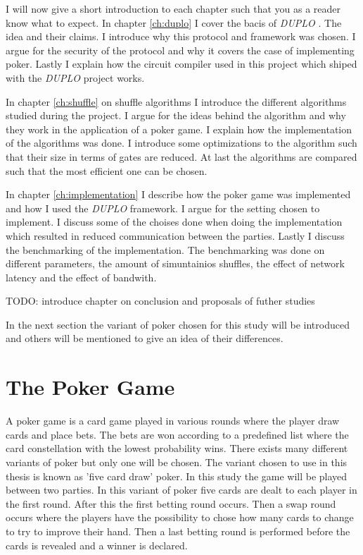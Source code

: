 \documentclass[twoside,11pt,openright]{report}
\newcommand{\todo}[1]{}
\renewcommand{\todo}[1]{{\color{red} TODO: {#1}} \\}
\newcommand{\DUPLO}{\textit{DUPLO} }
\begin{document}
\bigskip

I will now give a short introduction to each chapter such that you as a reader know what to expect. 
In chapter \ref{ch:duplo} I cover the bacis of \DUPLO. The idea and their claims. I introduce why this protocol and framework was chosen. I argue for the security of the protocol and why it covers the case of implementing poker. Lastly I explain how the circuit compiler used in this project which shiped with the \DUPLO project works.

In chapter \ref{ch:shuffle} on shuffle algorithms I introduce the different algorithms studied during the project. I argue for the ideas behind the algorithm and why they work in the application of a poker game. I explain how the implementation of the algorithms was done. I introduce some optimizations to the algorithm such that their size in terms of gates are reduced. At last the algorithms are compared such that the most efficient one can be chosen.

In chapter \ref{ch:implementation} I describe how the poker game was implemented and how I used the \DUPLO framework. I argue for the setting chosen to implement. I discuss some of the choises done when doing the implementation which resulted in reduced communication between the parties. Lastly I discuss the benchmarking of the implementation. The benchmarking was done on different parameters, the amount of simuntainios shuffles, the effect of network latency and the effect of bandwith. 

\todo{introduce chapter on conclusion and proposals of futher studies}

\bigskip

In the next section the variant of poker chosen for this study will be introduced and others will be mentioned to give an idea of their differences.

\section{The Poker Game}
\label{sec:poker}
A poker game is a card game played in various rounds where the player draw cards and place bets. The bets are won according to a predefined list where the card constellation with the lowest probability wins. There exists many different variants of poker but only one will be chosen. The variant chosen to use in this thesis is known as 'five card draw' poker. In this study the game will be played between two parties. In this variant of poker five cards are dealt to each player in the first round. After this the first betting round occurs. Then a swap round occurs where the players have the possibility to chose how many cards to change to try to improve their hand. Then a last betting round is performed before the cards is revealed and a winner is declared.
\end{document}
